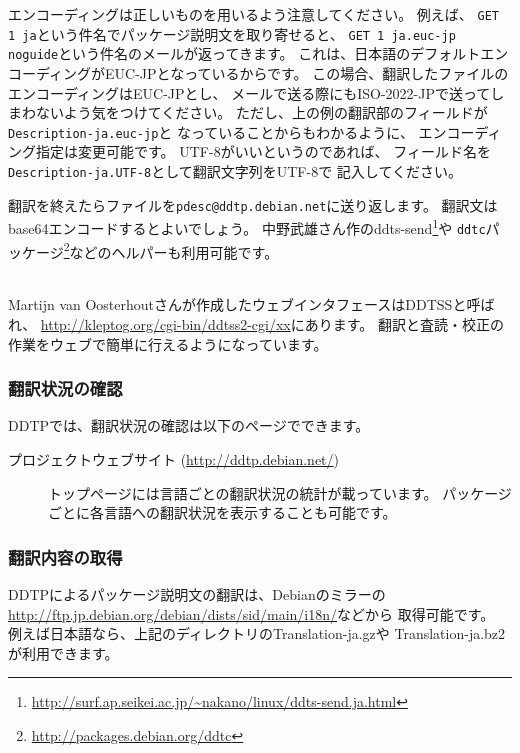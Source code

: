\documentclass[mingoth,a4paper]{jsarticle}
\newcommand{\subsubsubsection}[1]{%
\vspace{1zw}{\bf #1}\\}
\begin{document}
エンコーディングは正しいものを用いるよう注意してください。
例えば、
\texttt{GET 1 ja}という件名でパッケージ説明文を取り寄せると、
\texttt{GET 1 ja.euc-jp noguide}という件名のメールが返ってきます。
これは、日本語のデフォルトエンコーディングがEUC-JPとなっているからです。
この場合、翻訳したファイルのエンコーディングはEUC-JPとし、
メールで送る際にもISO-2022-JPで送ってしまわないよう気をつけてください。
ただし、上の例の翻訳部のフィールドが\texttt{Description-ja.euc-jp}と
なっていることからもわかるように、
エンコーディング指定は変更可能です。
UTF-8がいいというのであれば、
フィールド名を\texttt{Description-ja.UTF-8}として翻訳文字列をUTF-8で
記入してください。

翻訳を終えたらファイルを\texttt{pdesc@ddtp.debian.net}に送り返します。
翻訳文はbase64エンコードするとよいでしょう。
中野武雄さん作のddts-send\footnote{%
\url{http://surf.ap.seikei.ac.jp/~nakano/linux/ddts-send.ja.html}}や
\texttt{ddtc}パッケージ\footnote{%
\url{http://packages.debian.org/ddtc}}などのヘルパーも利用可能です。

\subsubsubsection{ウェブインタフェース}

Martijn van Oosterhoutさんが作成したウェブインタフェースはDDTSSと呼ばれ、
\url{http://kleptog.org/cgi-bin/ddtss2-cgi/xx}にあります。
翻訳と査読・校正の作業をウェブで簡単に行えるようになっています。


\subsubsection{翻訳状況の確認}

DDTPでは、翻訳状況の確認は以下のページでできます。

\begin{description}
 \item[プロジェクトウェブサイト (\url{http://ddtp.debian.net/})]
	    トップページには言語ごとの翻訳状況の統計が載っています。
	    パッケージごとに各言語への翻訳状況を表示することも可能です。
\end{description}

\subsubsection{翻訳内容の取得}

DDTPによるパッケージ説明文の翻訳は、Debianのミラーの
\url{http://ftp.jp.debian.org/debian/dists/sid/main/i18n/}などから
取得可能です。
例えば日本語なら、上記のディレクトリのTranslation-ja.gzや
Translation-ja.bz2が利用できます。
\end{document}
